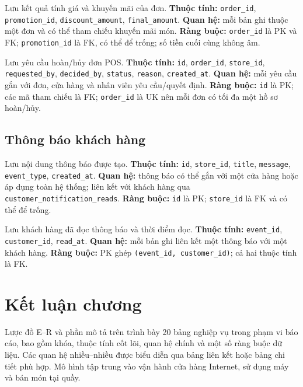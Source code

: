 \begin{description}[leftmargin=3.7cm,labelwidth=3.5cm,style=nextline]
  \item[\texttt{menu\_order\_pricing}] Lưu kết quả tính giá và khuyến mãi của đơn. \textbf{Thuộc tính:} \texttt{order\_id}, \texttt{promotion\_id}, \texttt{discount\_amount}, \texttt{final\_amount}. \textbf{Quan hệ:} mỗi bản ghi thuộc một đơn và có thể tham chiếu khuyến mãi món. \textbf{Ràng buộc:} \texttt{order\_id} là PK và FK; \texttt{promotion\_id} là FK, có thể để trống; số tiền cuối cùng không âm.
  \item[\texttt{pos\_order\_reversals}] Lưu yêu cầu hoàn/hủy đơn POS. \textbf{Thuộc tính:} \texttt{id}, \texttt{order\_id}, \texttt{store\_id}, \texttt{requested\_by}, \texttt{decided\_by}, \texttt{status}, \texttt{reason}, \texttt{created\_at}. \textbf{Quan hệ:} mỗi yêu cầu gắn với đơn, cửa hàng và nhân viên yêu cầu/quyết định. \textbf{Ràng buộc:} \texttt{id} là PK; các mã tham chiếu là FK; \texttt{order\_id} là UK nên mỗi đơn có tối đa một hồ sơ hoàn/hủy.
\end{description}

\subsection{Thông báo khách hàng}
\begin{description}[leftmargin=3.7cm,labelwidth=3.5cm,style=nextline]
  \item[\texttt{customer\_notification\_events}] Lưu nội dung thông báo được tạo. \textbf{Thuộc tính:} \texttt{id}, \texttt{store\_id}, \texttt{title}, \texttt{message}, \texttt{event\_type}, \texttt{created\_at}. \textbf{Quan hệ:} thông báo có thể gắn với một cửa hàng hoặc áp dụng toàn hệ thống; liên kết với khách hàng qua \texttt{customer\_notification\_reads}. \textbf{Ràng buộc:} \texttt{id} là PK; \texttt{store\_id} là FK và có thể để trống.
  \item[\texttt{customer\_notification\_reads}] Lưu khách hàng đã đọc thông báo và thời điểm đọc. \textbf{Thuộc tính:} \texttt{event\_id}, \texttt{customer\_id}, \texttt{read\_at}. \textbf{Quan hệ:} mỗi bản ghi liên kết một thông báo với một khách hàng. \textbf{Ràng buộc:} PK ghép \texttt{(event\_id, customer\_id)}; cả hai thuộc tính là FK.
\end{description}

\section{Kết luận chương}
Lược đồ E--R và phần mô tả trên trình bày 20 bảng nghiệp vụ trong phạm vi báo cáo, bao gồm khóa, thuộc tính cốt lõi, quan hệ chính và một số ràng buộc dữ liệu. Các quan hệ nhiều--nhiều được biểu diễn qua bảng liên kết hoặc bảng chi tiết phù hợp. Mô hình tập trung vào vận hành cửa hàng Internet, sử dụng máy và bán món tại quầy.
